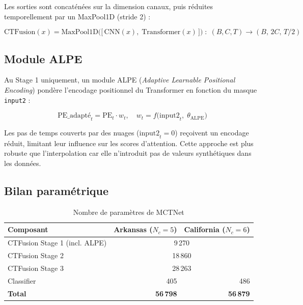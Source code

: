 Les sorties sont concaténées sur la dimension canaux, puis réduites
temporellement par un MaxPool1D (stride 2) :

\begin{equation}
  \text{CTFusion}(x) =
  \text{MaxPool1D}\!\Big(\big[\,\text{CNN}(x),\;\text{Transformer}(x)\,\big]\Big)
  \;:\; (B,C,T) \to (B,\,2C,\,T/2)
\end{equation}

\subsection{Module ALPE}

Au Stage 1 uniquement, un module ALPE (\textit{Adaptive Learnable Positional
Encoding}) pondère l'encodage positionnel du Transformer en fonction du masque
\texttt{input2} :

\begin{equation}
  \text{PE\_adapté}_t = \text{PE}_t \cdot w_t, \quad
  w_t = f\!\big(\text{input2}_t,\; \theta_{\text{ALPE}}\big)
\end{equation}

Les pas de temps couverts par des nuages ($\text{input2}_t = 0$) reçoivent
un encodage réduit, limitant leur influence sur les scores d'attention. Cette
approche est plus robuste que l'interpolation car elle n'introduit pas de
valeurs synthétiques dans les données.

\subsection{Bilan paramétrique}

\begin{table}[H]
\centering
\caption{Nombre de paramètres de MCTNet}
\label{tab:params_mctnet}
\begin{tabular}{lrr}
\toprule
\textbf{Composant} & \textbf{Arkansas ($N_c=5$)} & \textbf{California ($N_c=6$)} \\
\midrule
CTFusion Stage 1 (incl. ALPE) & \multicolumn{2}{c}{9\,270} \\
CTFusion Stage 2              & \multicolumn{2}{c}{18\,860} \\
CTFusion Stage 3              & \multicolumn{2}{c}{28\,263} \\
Classifier                    & 405 & 486 \\
\midrule
\textbf{Total}     & \textbf{56\,798} & \textbf{56\,879} \\
\bottomrule
\end{tabular}
\end{table}

